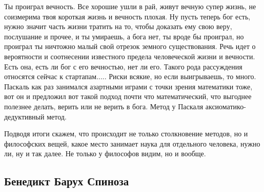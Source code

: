 \documentclass[a4paper, 12pt]{article}
\begin{document}
Ты проиграл вечность. Все хорошие ушли в рай, живут вечную супер жизнь, 
не соизмерима твоя короткая жизнь и вечность плохая. Ну пусть теперь бог 
есть, нужно значит часть жизни тратить на то, чтобы доказать ему свою 
веру, послушание и прочее, и ты умираешь, а бога нет, ты вроде бы 
проиграл, но проиграл ты ничтожно малый свой отрезок земного 
существования. Речь идет о вероятности и соотнесении известного предела 
человеческой жизни и вечности. Есть она, есть ли бог с его вечностью, 
нет ли его. Такого рода рассуждения относятся сейчас к стартапам..... 
Риски всякие, но если выигрываешь, то много. Паскаль как раз занимался 
азартными играми с точки зрения математики тоже, вот он и предложил вот 
такой подход почти что математический, что выгоднее полезнее делать, 
верить или не верить в бога. Метод у Паскаля аксиоматико-дедуктивный 
метод.

Подводя итоги скажем, что происходит не только столкновение методов, но 
и философских вещей, какое место занимает наука для отдельного человека, 
нужно ли, ну и так далее. Не только у философов видим, но и вообще.


\subsection{Бенедикт Барух Спиноза}
\end{document}
